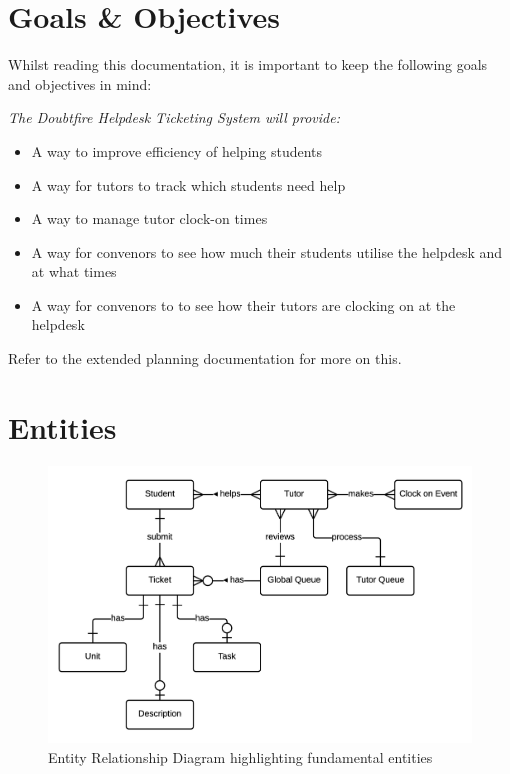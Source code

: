 \documentclass[12pt,a4paper,]{article}
\date{}
\providecommand{\tightlist}{%
  \setlength{\itemsep}{0pt}\setlength{\parskip}{0pt}}
\begin{document}
{
\setcounter{tocdepth}{3}
\tableofcontents
}
\newpage
\section{Goals \& Objectives}\label{goals-objectives}

Whilst reading this documentation, it is important to keep the following
goals and objectives in mind:

\emph{The Doubtfire Helpdesk Ticketing System will provide:}

\begin{itemize}
\tightlist
\item
  A way to improve efficiency of helping students
\item
  A way for tutors to track which students need help
\item
  A way to manage tutor clock-on times
\item
  A way for convenors to see how much their students utilise the
  helpdesk and at what times
\item
  A way for convenors to to see how their tutors are clocking on at the
  helpdesk
\end{itemize}

Refer to the extended planning documentation for more on this.

\section{Entities}\label{entities}


\begin{figure}[h!]
  \centering
  \includegraphics{5d0054b7-3365-4f00-a4a1-d29212ec68f0.png}
  \caption{Entity Relationship Diagram highlighting fundamental entities}
  \label{ed}
\end{figure}
\end{document}
